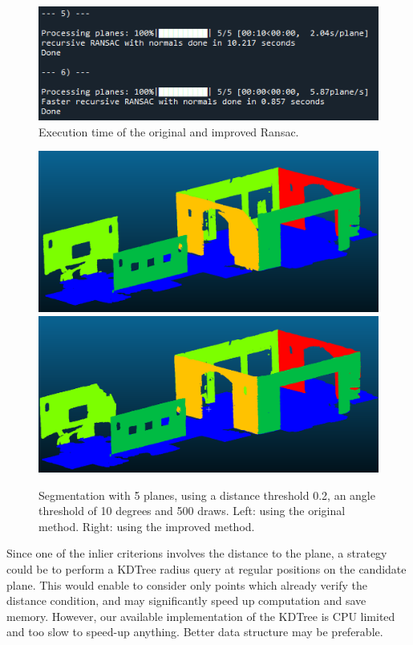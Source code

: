 \documentclass[a4paper]{article}
\begin{document}
\begin{figure}[ht]
    \centering
    \includegraphics[width=0.3\linewidth]{figures/bonus.png}
    \caption{Execution time of the original and improved Ransac.}
    \label{fig:bonus_1}
\end{figure}

\begin{figure}[ht]
    \centering
    \includegraphics[width=0.3\linewidth]{figures/Q4.png}
    \includegraphics[width=0.3\linewidth]{figures/bonus_2.png}
    \caption{Segmentation with 5 planes, using a distance threshold 0.2, an angle threshold of 10 degrees and 500 draws.
    Left: using the original method. Right: using the improved method.}
    \label{fig:bonus_2}
\end{figure}

Since one of the inlier criterions involves the distance to the plane, a strategy could be to perform a KDTree radius query at regular positions on the candidate plane. This would enable to consider only points which already verify
the distance condition, and may significantly speed up computation and save memory. However, our available implementation of the KDTree is CPU limited and too slow to speed-up anything. Better data structure may be preferable.
\end{document}
